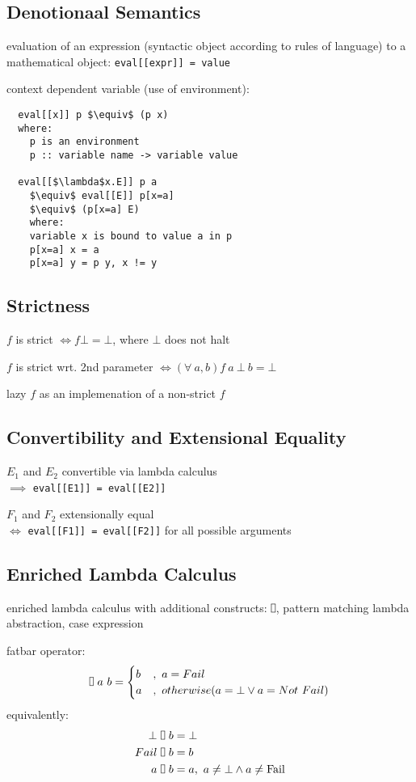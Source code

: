 \documentclass[8pt]{extarticle}
\newcommand*{\vrectangle}{{\setlength{\fboxsep}{0pt}\fbox{\phantom{l}}}}
\begin{document}
\begin{multicols*}{2}
  \subsection{Denotionaal Semantics}
  
  evaluation of an expression (syntactic object according to rules of language) to a mathematical object: \verb|eval[[expr]] = value|

  context dependent variable (use of environment):
\begin{lstlisting}
  eval[[x]] p $\equiv$ (p x)
  where:
    p is an environment
    p :: variable name -> variable value

  eval[[$\lambda$x.E]] p a
    $\equiv$ eval[[E]] p[x=a]
    $\equiv$ (p[x=a] E)
    where:
    variable x is bound to value a in p
    p[x=a] x = a
    p[x=a] y = p y, x != y
\end{lstlisting}
  
\subsection{Strictness}

$f$ is strict $\iff f \bot = \bot$, where $\bot$ does not halt

$f$ is strict wrt. 2nd parameter $\iff (\forall\ a, b) f\ a\ \bot\ b = \bot$

lazy $f$ as an implemenation of a non-strict $f$

\subsection{Convertibility and Extensional Equality}

$E_1$ and $E_2$ convertible via lambda calculus\\
$\implies$ \verb|eval[[E1]] = eval[[E2]]|

$F_1$ and $F_2$ extensionally equal\\
$\iff$ \verb|eval[[F1]] = eval[[F2]]| for all possible arguments

  \subsection{Enriched Lambda Calculus}
  enriched lambda calculus with additional constructs: $\vrectangle$, pattern matching lambda abstraction, case expression
  
  fatbar operator:
  \begin{align*}
    \vrectangle\ a\ b = \begin{cases}
      b&,\ a = Fail\\
      a&,\ otherwise (a=\bot \vee a=Not\ Fail)
    \end{cases}
  \end{align*}
  equivalently:
\begin{align*}
  \bot\ &\vrectangle\ b = \bot\\
  Fail\ &\vrectangle\ b = b\\
  a\ &\vrectangle\ b = a,\ a \neq \bot \wedge a \neq \text{Fail}
\end{align*}


\end{multicols*}
\end{document}
